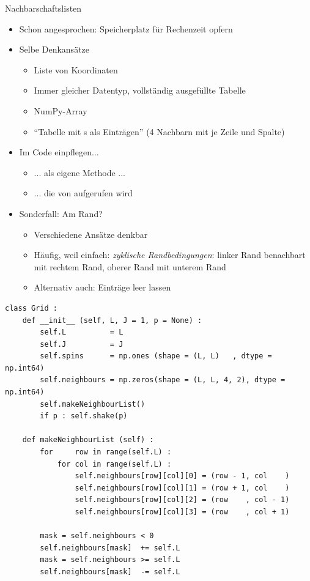 \begin{frame}[fragile]{Nachbarschaftslisten}
%
\begin{itemize}
\item Schon angesprochen: Speicherplatz für Rechenzeit opfern
\item Selbe Denkansätze
	\begin{itemize}
	\item Liste von Koordinaten
	\item Immer gleicher Datentyp, vollständig ausgefüllte Tabelle
	\item[\Thus] NumPy-Array
	\item \enquote{Tabelle mit s als Einträgen} (4 Nachbarn mit je Zeile und Spalte)
	\end{itemize}
\item Im Code einpflegen...
	\begin{itemize}
	\item ... als eigene Methode ...
	\item ... die von  aufgerufen wird
	\end{itemize}
\item Sonderfall: Am Rand?
	\begin{itemize}
	\item Verschiedene Ansätze denkbar
	\item Häufig, weil einfach: \emph{zyklische Randbedingungen}: linker Rand benachbart mit rechtem Rand, oberer Rand mit unterem Rand
	\item Alternativ auch: Einträge leer lassen
	\end{itemize}
\end{itemize}
%
\end{frame}


\begin{frame}[fragile]
%
\begin{codebox}
\begin{verbatim}
class Grid :
    def __init__ (self, L, J = 1, p = None) :
        self.L          = L
        self.J          = J
        self.spins      = np.ones (shape = (L, L)   , dtype = np.int64)
        self.neighbours = np.zeros(shape = (L, L, 4, 2), dtype = np.int64)
        self.makeNeighbourList()
        if p : self.shake(p)
    
    def makeNeighbourList (self) :
        for     row in range(self.L) :
            for col in range(self.L) :
                self.neighbours[row][col][0] = (row - 1, col    )
                self.neighbours[row][col][1] = (row + 1, col    )
                self.neighbours[row][col][2] = (row    , col - 1)
                self.neighbours[row][col][3] = (row    , col + 1)
                
        mask = self.neighbours < 0
        self.neighbours[mask]  += self.L
        mask = self.neighbours >= self.L
        self.neighbours[mask]  -= self.L
\end{verbatim}
\end{codebox}
%
\end{frame}

